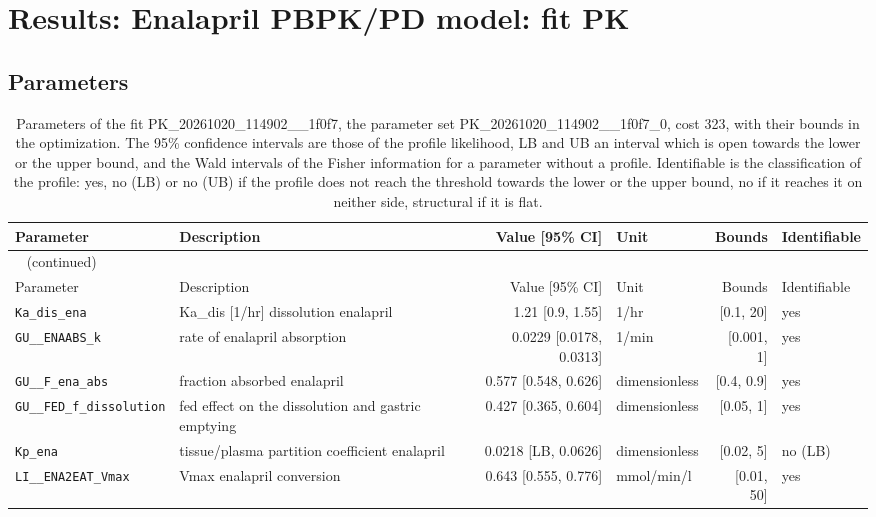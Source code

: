 \documentclass{article}
\begin{document}
\section{Results: Enalapril PBPK/PD model: fit PK}

\subsection{Parameters}

\begin{longtable}{llrlrl}
\caption{Parameters of the fit PK\_20261020\_114902\_\_1f0f7, the parameter set PK\_20261020\_114902\_\_1f0f7\_0, cost 323, with their bounds in the optimization. The 95\% confidence intervals are those of the profile likelihood, LB and UB an interval which is open towards the lower or the upper bound, and the Wald intervals of the Fisher information for a parameter without a profile. Identifiable is the classification of the profile: yes, no (LB) or no (UB) if the profile does not reach the threshold towards the lower or the upper bound, no if it reaches it on neither side, structural if it is flat.}\label{tab:parameters:PK_20261020_114902__1f0f7} \\
\toprule
Parameter & Description & Value [95\% CI] & Unit & Bounds & Identifiable \\
\midrule
\endfirsthead
\multicolumn{6}{l}{\small\tablename~\thetable{} (continued)} \\
\toprule
Parameter & Description & Value [95\% CI] & Unit & Bounds & Identifiable \\
\midrule
\endhead
\bottomrule
\endlastfoot
\texttt{Ka\_dis\_ena} & Ka\_dis [1/hr] dissolution enalapril & 1.21 [0.9, 1.55] & 1/hr & [0.1, 20] & yes \\
\texttt{GU\_\_ENAABS\_k} & rate of enalapril absorption & 0.0229 [0.0178, 0.0313] & 1/min & [0.001, 1] & yes \\
\texttt{GU\_\_F\_ena\_abs} & fraction absorbed enalapril & 0.577 [0.548, 0.626] & dimensionless & [0.4, 0.9] & yes \\
\texttt{GU\_\_FED\_f\_dissolution} & fed effect on the dissolution and gastric emptying & 0.427 [0.365, 0.604] & dimensionless & [0.05, 1] & yes \\
\texttt{Kp\_ena} & tissue/plasma partition coefficient enalapril & 0.0218 [LB, 0.0626] & dimensionless & [0.02, 5] & no (LB) \\
\texttt{LI\_\_ENA2EAT\_Vmax} & Vmax enalapril conversion & 0.643 [0.555, 0.776] & mmol/min/l & [0.01, 50] & yes \\

\end{longtable}
\end{document}
